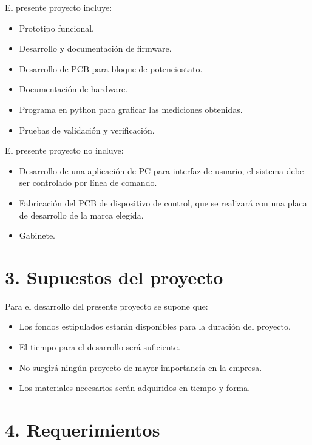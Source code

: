 \documentclass[11pt]{charter}
\begin{document}
El presente proyecto incluye:
\begin{itemize}
\item Prototipo funcional.
\item Desarrollo y documentación de firmware.
\item Desarrollo de PCB para bloque de potenciostato.
\item Documentación de hardware.
\item Programa en python para graficar las mediciones obtenidas.  
\item Pruebas de validación y verificación.
\end{itemize}

El presente proyecto no incluye:
\begin{itemize}
\item Desarrollo de una aplicación de PC para interfaz de usuario, el sistema debe ser controlado por línea de comando.
\item Fabricación del PCB de dispositivo de control, que se realizará con una placa de desarrollo de la marca elegida.
\item Gabinete.
\end{itemize}


\section{3. Supuestos del proyecto}
\label{sec:supuestos}
Para el desarrollo del presente proyecto se supone que:
\begin{itemize}
\item Los fondos estipulados estarán disponibles para la duración del proyecto.
\item El tiempo para el desarrollo será suficiente.
\item No surgirá ningún proyecto de mayor importancia en la empresa.
\item Los materiales necesarios serán adquiridos en tiempo y forma.
\end{itemize}

\section{4. Requerimientos}
\label{sec:requerimientos}
\end{document}
